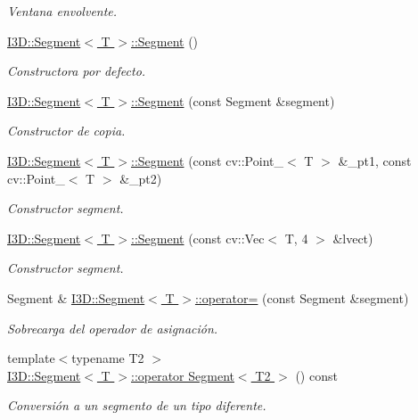 \begin{DoxyCompactItemize}
\begin{DoxyCompactList}\small\item\em Ventana envolvente. \end{DoxyCompactList}\item 
\hyperlink{group___geometric_entities_gac1c7a78862638e88bd9d9f512d6acc49}{I3\+D\+::\+Segment$<$ T $>$\+::\+Segment} ()
\begin{DoxyCompactList}\small\item\em Constructora por defecto. \end{DoxyCompactList}\item 
\hyperlink{group___geometric_entities_ga39a1c7ab363a4531d780dd35b6fc79f6}{I3\+D\+::\+Segment$<$ T $>$\+::\+Segment} (const Segment \&segment)
\begin{DoxyCompactList}\small\item\em Constructor de copia. \end{DoxyCompactList}\item 
\hyperlink{group___geometric_entities_ga76e944eff092cf055965199957820f5b}{I3\+D\+::\+Segment$<$ T $>$\+::\+Segment} (const cv\+::\+Point\+\_\+$<$ T $>$ \&\+\_\+pt1, const cv\+::\+Point\+\_\+$<$ T $>$ \&\+\_\+pt2)
\begin{DoxyCompactList}\small\item\em Constructor segment. \end{DoxyCompactList}\item 
\hyperlink{group___geometric_entities_ga01623dcfd1be4e9472390b59e0ca3a58}{I3\+D\+::\+Segment$<$ T $>$\+::\+Segment} (const cv\+::\+Vec$<$ T, 4 $>$ \&lvect)
\begin{DoxyCompactList}\small\item\em Constructor segment. \end{DoxyCompactList}\item 
Segment \& \hyperlink{group___geometric_entities_gad1b2c0a4c4e1ea3c43ee24630eb26f1b}{I3\+D\+::\+Segment$<$ T $>$\+::operator=} (const Segment \&segment)
\begin{DoxyCompactList}\small\item\em Sobrecarga del operador de asignación. \end{DoxyCompactList}\item 
{\footnotesize template$<$typename T2 $>$ }\\\hyperlink{group___geometric_entities_ga363ef30b40d13ee361b9f0e32f135655}{I3\+D\+::\+Segment$<$ T $>$\+::operator Segment$<$ T2 $>$} () const 
\begin{DoxyCompactList}\small\item\em Conversión a un segmento de un tipo diferente. \end{DoxyCompactList}\item 

\end{DoxyCompactItemize}
